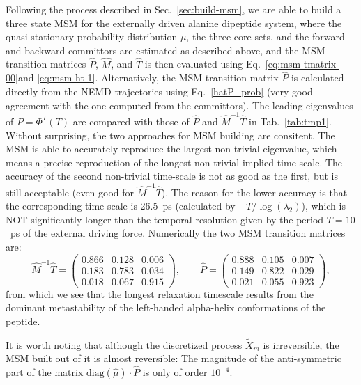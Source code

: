 \documentclass[aps, pre, preprint,unsortedaddress,a4paper,onecolumn]{revtex4}
\newcommand{\myphi}{\Phi}
\begin{document}
Following the process described in Sec.~\ref{sec:build-msm}, we are able to build a 
three state MSM for the externally driven alanine dipeptide system,
where the quasi-stationary probability distribution $\mu$, the three core sets, and the forward and backward committors are
estimated as described above, and the MSM transition matrices $\hat P$, $\hat{M}$, and $\hat{T}$ is then evaluated using Eq.~\eqref{eq:msm-tmatrix-00}and \eqref{eq:msm-ht-1}.
Alternatively, the MSM  transition matrix $\hat P$ is calculated directly from the NEMD trajectories using Eq.~\eqref{hatP_prob} (very good agreement with the one computed from the committors).
The leading eigenvalues of $P=\myphi^T(T)$ are compared with those of $\hat P$ and $\hat{M}^{-1}\hat{T}$ in
Tab.~\ref{tab:tmp1}.
Without surprising, the two approaches for MSM building are consitent.
The MSM is able to accurately reproduce
the largest non-trivial eigenvalue, which means a precise reproduction
of the longest non-trivial implied time-scale. The accuracy of the second non-trivial
time-scale is not as good as the first, but is still acceptable (even good for $\hat{M}^{-1}\hat{T}$). The reason
for the lower accuracy is that
the corresponding time scale is 26.5~ps (calculated by $-T/\log(\lambda_2)$),
which is NOT significantly longer than the temporal resolution given by the period $T=10$~ps of the external driving force.
Numerically the two MSM transition matrices are:
\[
\hat{M}^{-1}\hat{T}=\left(\begin{array}{ccc}
   0.866 &   0.128 &   0.006 \\
    0.183  &  0.783  &  0.034\\
    0.018   & 0.067 &   0.915
\end{array}
\right),\qquad \hat{P}=\left(\begin{array}{ccc}
   0.888 &   0.105 &   0.007 \\
    0.149  &  0.822  &  0.029\\
    0.021   & 0.055 &   0.923
\end{array}
\right),
\]
from which we see that the longest relaxation timescale results from  the dominant metastability of the left-handed alpha-helix conformations of the peptide.
 
It is worth noting that although the discretized process $\tilde X_m$ is irreversible,
the MSM built out of it is almost reversible:
The magnitude of the anti-symmetric part of the
matrix $\textrm{diag}(\hat \mu)\cdot \hat P$ is only of order $10^{-4}$.
\end{document}
